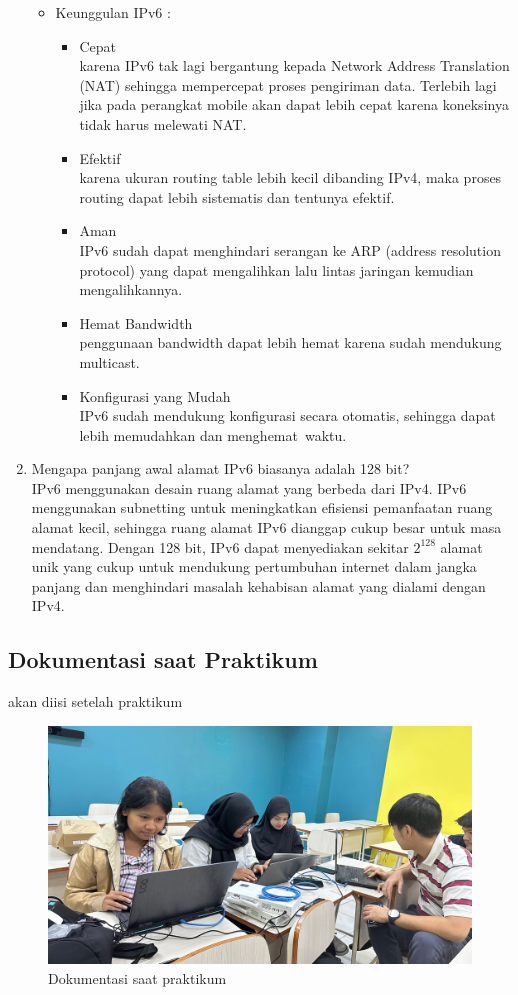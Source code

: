 \begin{enumerate}
	\begin{itemize}
		\item Keunggulan IPv6 :
		\begin{itemize}
			\item[\ding{58}] Cepat \\ karena IPv6 tak lagi bergantung kepada Network Address Translation (NAT) sehingga mempercepat proses pengiriman data. Terlebih lagi jika pada perangkat mobile akan dapat lebih cepat karena koneksinya tidak harus melewati NAT.
			\item[\ding{58}] Efektif \\ karena ukuran routing table lebih kecil dibanding IPv4, maka proses routing dapat lebih sistematis dan tentunya efektif.
			\item[\ding{58}] Aman \\ IPv6 sudah dapat menghindari serangan ke ARP (address resolution protocol) yang dapat mengalihkan lalu lintas jaringan kemudian mengalihkannya.
			\item[\ding{58}] Hemat Bandwidth \\ penggunaan bandwidth dapat lebih hemat karena sudah mendukung multicast.
			\item[\ding{58}] Konfigurasi yang Mudah \\ IPv6 sudah mendukung konfigurasi secara otomatis, sehingga dapat lebih memudahkan dan menghemat waktu.
		\end{itemize}
	\end{itemize}

	\item Mengapa panjang awal alamat IPv6 biasanya adalah 128 bit?
	\\ \indent IPv6 menggunakan desain ruang alamat yang berbeda dari IPv4. IPv6 menggunakan subnetting untuk meningkatkan efisiensi pemanfaatan ruang alamat kecil, sehingga ruang alamat IPv6 dianggap cukup besar untuk masa mendatang. 
	Dengan 128 bit, IPv6 dapat menyediakan sekitar $2^{128}$ alamat unik yang cukup untuk mendukung pertumbuhan internet dalam jangka panjang dan menghindari masalah kehabisan alamat yang dialami dengan IPv4.

\end{enumerate}

\subsection{Dokumentasi saat Praktikum}
akan diisi setelah praktikum
\begin{figure}[H]
	\centering
	\includegraphics[width=0.75\linewidth]{P5/img/dokumpraktikum.jpg}
	\caption{Dokumentasi saat praktikum}
	\label{fig:gambar32}
\end{figure}
